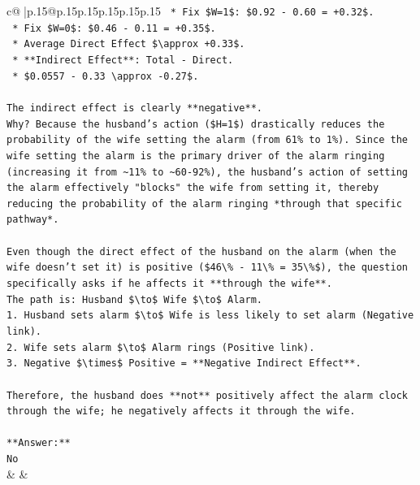 \documentclass{article}
\begin{document}
{\begin{supertabular}{c@{$\;$}|p{.15\linewidth}@{}p{.15\linewidth}p{.15\linewidth}p{.15\linewidth}p{.15\linewidth}p{.15\linewidth}}
{{{\texttt{        *   Fix \$W=1\$: \$0.92 {-} 0.60 = +0.32\$.} \\
\texttt{        *   Fix \$W=0\$: \$0.46 {-} 0.11 = +0.35\$.} \\
\texttt{        *   Average Direct Effect \$\textbackslash{}approx +0.33\$.} \\
\texttt{    *   **Indirect Effect**: Total {-} Direct.} \\
\texttt{        *   \$0.0557 {-} 0.33 \textbackslash{}approx {-}0.27\$.} \\
\\ 
\texttt{The indirect effect is clearly **negative**.} \\
\texttt{Why? Because the husband's action (\$H=1\$) drastically reduces the probability of the wife setting the alarm (from 61\% to 1\%). Since the wife setting the alarm is the primary driver of the alarm ringing (increasing it from \textasciitilde{}11\% to \textasciitilde{}60{-}92\%), the husband's action of setting the alarm effectively "blocks" the wife from setting it, thereby reducing the probability of the alarm ringing *through that specific pathway*.} \\
\\ 
\texttt{Even though the direct effect of the husband on the alarm (when the wife doesn't set it) is positive (\$46\textbackslash{}\% {-} 11\textbackslash{}\% = 35\textbackslash{}\%\$), the question specifically asks if he affects it **through the wife**.} \\
\texttt{The path is: Husband \$\textbackslash{}to\$ Wife \$\textbackslash{}to\$ Alarm.} \\
\texttt{1.  Husband sets alarm \$\textbackslash{}to\$ Wife is less likely to set alarm (Negative link).} \\
\texttt{2.  Wife sets alarm \$\textbackslash{}to\$ Alarm rings (Positive link).} \\
\texttt{3.  Negative \$\textbackslash{}times\$ Positive = **Negative Indirect Effect**.} \\
\\ 
\texttt{Therefore, the husband does **not** positively affect the alarm clock through the wife; he negatively affects it through the wife.} \\
\\ 
\texttt{**Answer:**} \\
\texttt{No} \\
            }
        }
    }
    & & \\ \\


\end{supertabular}}
\end{document}

